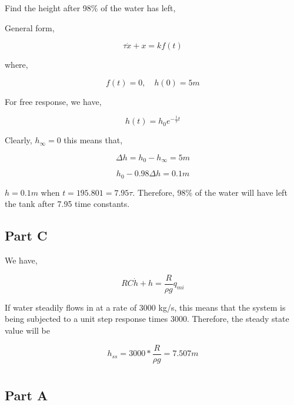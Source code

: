 \documentclass[12pt]{article}
\numberwithin{equation}{subsection}
\begin{document}
  Find the height after 98\% of the water has left,

  General form,

  \begin{equation}
    \tau \dot x + x = k f(t)
  \end{equation}

  where,

  \begin{equation}
    f(t) = 0, \quad h(0) = 5m
  \end{equation}

  For free response, we have,

  \begin{equation}
    h(t) = h_0 e^{-\frac{1}{\tau}t}
  \end{equation}

  Clearly, $ h_\infty = 0 $ this means that,

  \begin{equation}
    \Delta h = h_0 - h_\infty = 5m
  \end{equation}

  \begin{equation}
    h_0 - 0.98\Delta h = 0.1m
  \end{equation}

  $ h = 0.1m $ when $ t = 195.801 = 7.95\tau. $ Therefore, 98\% of the water will have left the tank after 7.95 time constants.

  \subsection{Part C}

  We have,

  \begin{equation}
    RC \dot h + h = \frac{R}{\rho g}q_{mi}
  \end{equation}

  If water steadily flows in at a rate of 3000 kg/s, this means that the system is being subjected to a unit step response times 3000. Therefore, the steady state value will be

  \begin{equation}
    h_{ss} = 3000 * \frac{R}{\rho g} = 7.507m
  \end{equation}

  \section{}

  \subsection{Part A}
\end{document}
